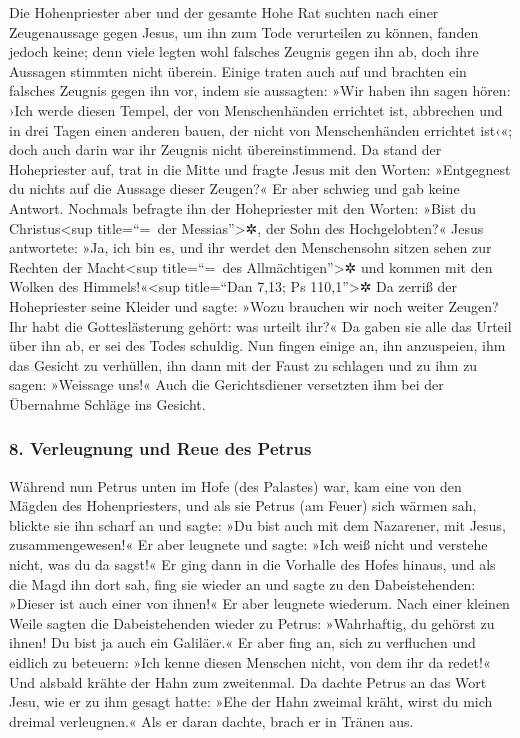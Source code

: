  Die Hohenpriester aber und der gesamte Hohe Rat suchten
nach einer Zeugenaussage gegen Jesus, um ihn zum Tode verurteilen zu
können, fanden jedoch keine;  denn viele legten wohl
falsches Zeugnis gegen ihn ab, doch ihre Aussagen stimmten nicht
überein.  Einige traten auch auf und brachten ein
falsches Zeugnis gegen ihn vor, indem sie aussagten: 
»Wir haben ihn sagen hören: ›Ich werde diesen Tempel, der von
Menschenhänden errichtet ist, abbrechen und in drei Tagen einen anderen
bauen, der nicht von Menschenhänden errichtet ist‹«; 
doch auch darin war ihr Zeugnis nicht übereinstimmend. 
Da stand der Hohepriester auf, trat in die Mitte und fragte Jesus mit
den Worten: »Entgegnest du nichts auf die Aussage dieser Zeugen?«
 Er aber schwieg und gab keine Antwort. Nochmals befragte
ihn der Hohepriester mit den Worten: »Bist du Christus\textless sup
title=``=~der Messias''\textgreater✲, der Sohn des Hochgelobten?«
 Jesus antwortete: »Ja, ich bin es, und ihr werdet den
Menschensohn sitzen sehen zur Rechten der Macht\textless sup
title=``=~des Allmächtigen''\textgreater✲ und kommen mit den Wolken des
Himmels!«\textless sup title=``Dan 7,13; Ps 110,1''\textgreater✲
 Da zerriß der Hohepriester seine Kleider und sagte:
»Wozu brauchen wir noch weiter Zeugen?  Ihr habt die
Gotteslästerung gehört: was urteilt ihr?« Da gaben sie alle das Urteil
über ihn ab, er sei des Todes schuldig.  Nun fingen
einige an, ihn anzuspeien, ihm das Gesicht zu verhüllen, ihn dann mit
der Faust zu schlagen und zu ihm zu sagen: »Weissage uns!« Auch die
Gerichtsdiener versetzten ihm bei der Übernahme Schläge ins Gesicht.

\hypertarget{verleugnung-und-reue-des-petrus}{%
\subsubsection{8. Verleugnung und Reue des
Petrus}\label{verleugnung-und-reue-des-petrus}}

 Während nun Petrus unten im Hofe (des Palastes) war, kam
eine von den Mägden des Hohenpriesters,  und als sie
Petrus (am Feuer) sich wärmen sah, blickte sie ihn scharf an und sagte:
»Du bist auch mit dem Nazarener, mit Jesus, zusammengewesen!«
 Er aber leugnete und sagte: »Ich weiß nicht und verstehe
nicht, was du da sagst!« Er ging dann in die Vorhalle des Hofes hinaus,
 und als die Magd ihn dort sah, fing sie wieder an und
sagte zu den Dabeistehenden: »Dieser ist auch einer von ihnen!«
 Er aber leugnete wiederum. Nach einer kleinen Weile
sagten die Dabeistehenden wieder zu Petrus: »Wahrhaftig, du gehörst zu
ihnen! Du bist ja auch ein Galiläer.«  Er aber fing an,
sich zu verfluchen und eidlich zu beteuern: »Ich kenne diesen Menschen
nicht, von dem ihr da redet!«  Und alsbald krähte der
Hahn zum zweitenmal. Da dachte Petrus an das Wort Jesu, wie er zu ihm
gesagt hatte: »Ehe der Hahn zweimal kräht, wirst du mich dreimal
verleugnen.« Als er daran dachte, brach er in Tränen aus.

